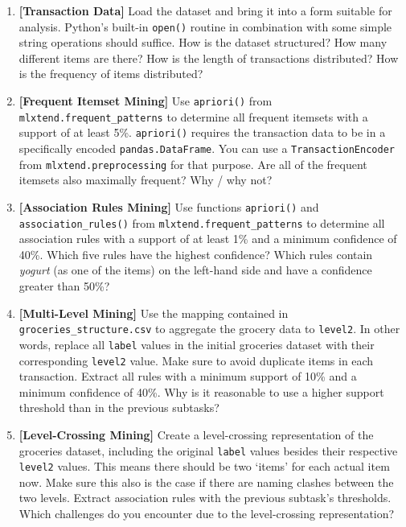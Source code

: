 \documentclass[12pt]{article}
\newcommand{\code}[1]{\textcolor{kitgreen}{\texttt{#1}}}
\newcommand{\taskname}[1]{\textcolor{kitblue}{\textbf{[#1]}}}
\begin{document}
\begin{enumerate}[label=\alph*), left=0pt, itemsep=12pt]
	\item
	\taskname{Transaction Data}
	Load the dataset and bring it into a form suitable for analysis.
	Python's built-in \code{open()} routine in combination with some simple string operations should suffice.
	\newline
	How is the dataset structured?
	How many different items are there?
	How is the length of transactions distributed?
	How is the frequency of items distributed?
	\item
	\taskname{Frequent Itemset Mining}
	Use \code{apriori()} from \code{mlxtend.frequent\_patterns} to determine all frequent itemsets with a support of at least 5\%.
	\code{apriori()} requires the transaction data to be in a specifically encoded \code{pandas.DataFrame}.
	You can use a \code{TransactionEncoder} from \code{mlxtend.preprocessing} for that purpose.
	\newline
	Are all of the frequent itemsets also maximally frequent?
	Why / why not?
	\item
	\taskname{Association Rules Mining}
	Use functions \code{apriori()} and \code{association\_rules()} from \code{mlxtend.frequent\_patterns} to determine all association rules with a support of at least 1\% and a minimum confidence of 40\%.
	\newline
	Which five rules have the highest confidence?
	Which rules contain \textit{yogurt} (as one of the items) on the left-hand side and have a confidence greater than 50\%?
	\item
	\taskname{Multi-Level Mining}
	Use the mapping contained in \code{groceries\_structure.csv} to aggregate the grocery data to \code{level2}.
	In other words, replace all \code{label} values in the initial groceries dataset with their corresponding \code{level2} value.
	Make sure to avoid duplicate items in each transaction.
	Extract all rules with a minimum support of 10\% and a minimum confidence of 40\%.
	\newline
	Why is it reasonable to use a higher support threshold than in the previous subtasks?
	\item
	\taskname{Level-Crossing Mining}
	Create a level-crossing representation of the groceries dataset, including the original \code{label} values besides their respective \code{level2} values.
	This means there should be two `items' for each actual item now.
	Make sure this also is the case if there are naming clashes between the two levels.
	Extract association rules with the previous subtask's thresholds.
	\newline
	Which challenges do you encounter due to the level-crossing representation?
\end{enumerate}
\end{document}

